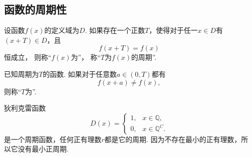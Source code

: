 \subsection{函数的周期性}
\begin{definition}
设函数\(f(x)\)的定义域为\(D\).
如果存在一个正数\(T\)，使得对于任一\(x \in D\)有\((x + T) \in D\)，且\[
	f(x+ T) = f(x)
\]恒成立，
则称“\(f(x)\)为”，
称“\(T\)为\(f(x)\)的周期”.

已知周期为\(T\)的函数.
如果对于任意数\(a \in (0,T)\)都有\[
	f(x + a) \neq f(x),
\]
则称“\(T\)为”.
\end{definition}

\begin{example}
狄利克雷函数\[
	D(x) = \left\{ \begin{array}{ll}
		1, & x \in \mathbb{Q}, \\
		0, & x \in \mathbb{Q}^C.
	\end{array} \right.
\]是一个周期函数，任何正有理数\(r\)都是它的周期.
因为不存在最小的正有理数，所以它没有最小正周期.
\end{example}
